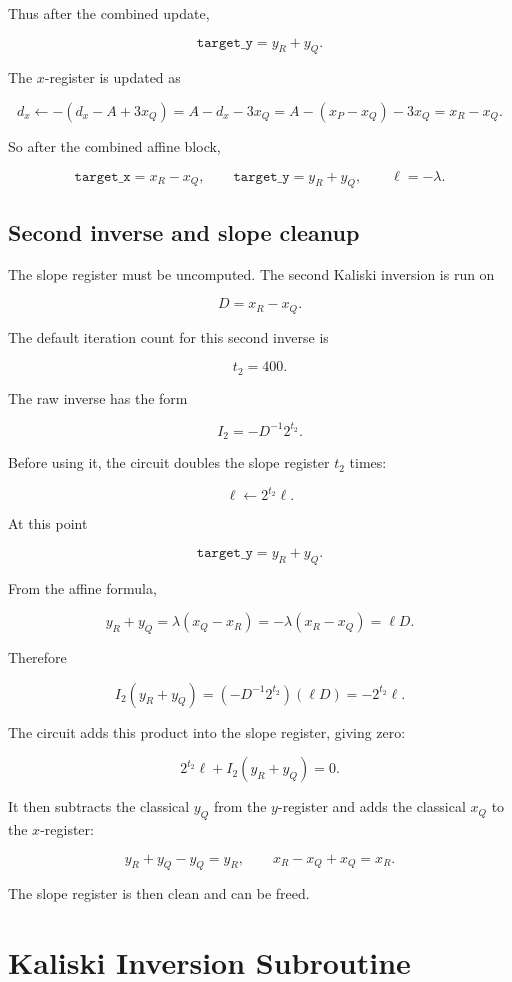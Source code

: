 \documentclass[11pt]{article}
\newcommand{\dx}{d_x}
\newcommand{\ellv}{\ell}
\begin{document}
Thus after the combined update,

\[
\texttt{target\_y} = y_R+y_Q.
\]

The \(x\)-register is updated as

\[
\dx \leftarrow -(\dx-A+3x_Q)
              = A-\dx-3x_Q
              = A-(x_P-x_Q)-3x_Q
              = x_R-x_Q.
\]

So after the combined affine block,

\[
\texttt{target\_x}=x_R-x_Q,
\qquad
\texttt{target\_y}=y_R+y_Q,
\qquad
\ellv=-\lambda.
\]

\subsection{Second inverse and slope cleanup}

The slope register must be uncomputed.  The second Kaliski inversion is run on

\[
D = x_R-x_Q.
\]

The default iteration count for this second inverse is

\[
t_2 = 400.
\]

The raw inverse has the form

\[
I_2 = -D^{-1}2^{t_2}.
\]

Before using it, the circuit doubles the slope register \(t_2\) times:

\[
\ellv \leftarrow 2^{t_2}\ellv.
\]

At this point

\[
\texttt{target\_y}=y_R+y_Q.
\]

From the affine formula,

\[
y_R+y_Q=\lambda(x_Q-x_R)=-\lambda(x_R-x_Q)=\ellv D.
\]

Therefore

\[
I_2(y_R+y_Q)
=
(-D^{-1}2^{t_2})(\ellv D)
=
-2^{t_2}\ellv.
\]

The circuit adds this product into the slope register, giving zero:

\[
2^{t_2}\ellv + I_2(y_R+y_Q)=0.
\]

It then subtracts the classical \(y_Q\) from the \(y\)-register and adds the
classical \(x_Q\) to the \(x\)-register:

\[
y_R+y_Q-y_Q=y_R,
\qquad
x_R-x_Q+x_Q=x_R.
\]

The slope register is then clean and can be freed.

\section{Kaliski Inversion Subroutine}
\end{document}

